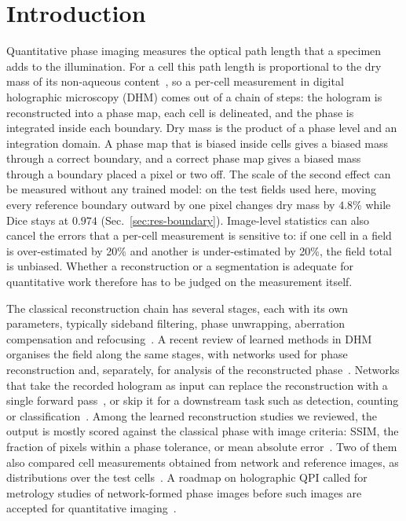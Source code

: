 \documentclass[11pt]{article}
\begin{document}
\section{Introduction}
\label{sec:intro}

Quantitative phase imaging measures the optical path length that a specimen
adds to the illumination. For a cell this path length is proportional to the
dry mass of its non-aqueous content~\cite{barer1952,zangle2014,lee2013qpi}, so
a per-cell measurement in digital holographic microscopy (DHM) comes out of a
chain of steps: the hologram is reconstructed into a phase map, each cell is
delineated, and the phase is integrated inside each boundary. Dry mass is the
product of a phase level and an integration domain. A phase map that is biased
inside cells gives a biased mass through a correct boundary, and a correct phase
map gives a biased mass through a boundary placed a pixel or two off. The scale
of the second effect can be measured without any trained model: on the test
fields used here, moving every reference boundary outward by one pixel changes
dry mass by $4.8\%$ while Dice stays at $0.974$ (Sec.~\ref{sec:res-boundary}).
Image-level statistics can also cancel the errors that a per-cell measurement
is sensitive to: if one cell in a field is over-estimated by 20\% and another is
under-estimated by 20\%, the field total is unbiased. Whether a reconstruction
or a segmentation is adequate for quantitative work therefore has to be judged
on the measurement itself.

The classical reconstruction chain has several stages, each with its own
parameters, typically sideband filtering, phase unwrapping, aberration
compensation and refocusing~\cite{zhao2023vynet,wen2025rbf,bai2026macrophage}.
A recent review of learned methods in DHM organises the field along the same
stages, with networks used for phase reconstruction and, separately, for
analysis of the reconstructed phase~\cite{moon2026aidhm}. Networks that take
the recorded hologram as input can replace the reconstruction with a single
forward pass~\cite{di2021phasenet,jaferzadeh2022holophasenet,zhao2023vynet,delikoyun2025rthad},
or skip it for a downstream task such as detection, counting or
classification~\cite{trujillo2019automatic,wen2026direct,delikoyun2025rthad}.
Among the learned reconstruction studies we reviewed, the output is mostly
scored against the classical phase with image criteria: SSIM, the fraction of
pixels within a phase tolerance, or mean absolute
error~\cite{di2021phasenet,zhao2023vynet,delikoyun2025rthad}. Two of them also
compared cell measurements obtained from network and reference images, as
distributions over the test cells~\cite{jaferzadeh2022holophasenet,park2026ai}.
A roadmap on holographic QPI called for metrology studies of network-formed
phase images before such images are accepted for quantitative
imaging~\cite{balasubramani2021roadmap}.
\end{document}
